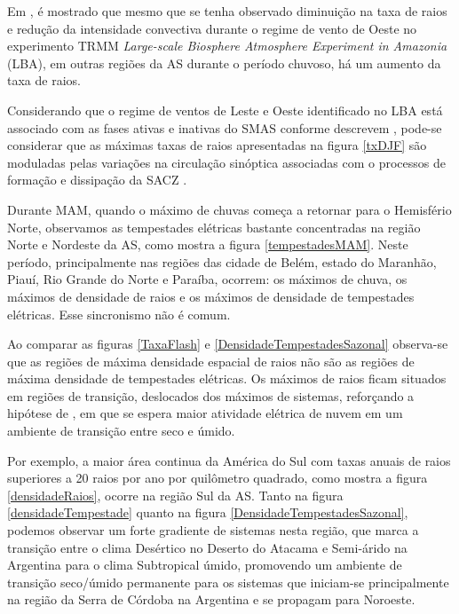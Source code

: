 Em , é mostrado que mesmo que se tenha observado diminuição na taxa de raios e redução da intensidade convectiva durante o regime de vento de Oeste no experimento TRMM \textit{Large-scale Biosphere Atmosphere Experiment in Amazonia} (LBA), em outras regiões da AS durante o período chuvoso, há um aumento da taxa de raios.

Considerando que o regime de ventos de Leste e Oeste identificado no LBA está associado com as fases ativas e inativas do SMAS conforme descrevem , pode-se considerar que as máximas taxas de raios apresentadas na figura \ref{txDJF} são moduladas pelas variações na circulação sinóptica associadas com o processos de formação e dissipação da SACZ \cite{petersen2002trmm,albrecht2011,silva2002lba}.

Durante MAM, quando o máximo de chuvas começa a retornar para o Hemisfério Norte, observamos as tempestades elétricas bastante concentradas na região Norte e Nordeste da AS, como mostra a figura \ref{tempestadesMAM}. Neste período, principalmente nas regiões das cidade de Belém, estado do Maranhão, Piauí, Rio Grande do Norte e Paraíba,  ocorrem: os máximos de chuva, os máximos de densidade de raios e os máximos de densidade de tempestades elétricas. Esse sincronismo não é comum.

Ao comparar as figuras \ref{TaxaFlash} e \ref{DensidadeTempestadesSazonal} observa-se que as regiões de máxima densidade espacial de raios não são as regiões de máxima densidade de tempestades elétricas. Os máximos de raios ficam situados em regiões de transição, deslocados dos máximos de sistemas, reforçando a hipótese de , em que se espera maior atividade elétrica de nuvem em um ambiente de transição entre seco e úmido.

Por exemplo, a maior área continua da América do Sul com taxas anuais de raios superiores a 20 raios por ano por quilômetro quadrado, como mostra a figura \ref{densidadeRaios}, ocorre na região Sul da AS. Tanto na figura \ref{densidadeTempestade} quanto na figura \ref{DensidadeTempestadesSazonal}, podemos observar um forte gradiente de sistemas nesta região, que marca a transição entre o clima Desértico no Deserto do Atacama e Semi-árido na Argentina para o clima Subtropical úmido, promovendo um ambiente de transição seco/úmido permanente para os sistemas que iniciam-se principalmente na região da Serra de Córdoba na Argentina e se propagam para Noroeste.

